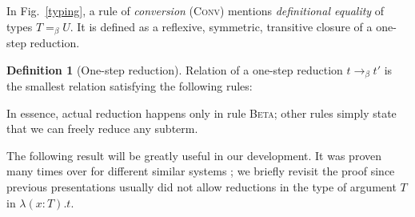 \documentclass{article}
\theoremstyle{definition}
\newtheorem{definition}{Definition}
\theoremstyle{remark}
\begin{document}
In Fig.~\ref{typing}, a rule of \textit{conversion}
(\textsc{Conv}) mentions \textit{definitional equality}
of types $T=_\beta U$. It is defined as a reflexive,
symmetric, transitive closure of a one-step reduction.

\begin{definition}[One-step reduction]
Relation of a one-step reduction $t\to_\beta t'$ is the
smallest relation satisfying the following rules:
\end{definition}

In essence, actual reduction happens only in rule
\textsc{Beta}; other rules simply state that we can
freely reduce any subterm.

The following result will be greatly useful in our
development. It was proven many times over for
different similar systems \cite{church1936properties,
barendregt1992lambda}; we briefly
revisit the proof since previous presentations usually
did not allow reductions in the type of argument $T$ in
$\lambda(x:T).t$.
\end{document}
